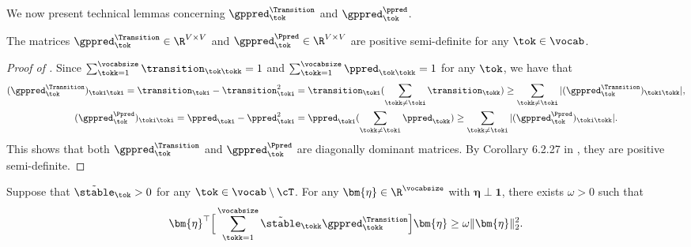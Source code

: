 We now present technical lemmas concerning $\gppred_\tok^{\Transition}$ and $\gppred_\tok^{\ppred}$.
\begin{lemma}\label{appthm:positive-definite}
The matrices $\gppred^\Transition_\tok \in \R^{V \times V}$ and $\gppred^\Ppred_\tok \in \R^{V \times V}$ are positive semi-definite for any $\tok \in \vocab$. 
\end{lemma}
\begin{proof}[Proof of ]
Since $\sum_{\tokk=1}^\vocabsize \transition_{\tok\tokk} = 1$ and $\sum_{\tokk=1}^\vocabsize \ppred_{\tok\tokk} = 1$ for any $\tok$, we have that
\begin{align*}
(\gppred^\Transition_\tok)_{\toki\toki}=\transition_\toki - \transition_{\toki}^2 & = \transition_\toki(\sum_{\tokk\neq\toki} \transition_\tokk) \geq \sum_{\tokk\neq\toki} |(\gppred^\Transition_\tok)_{\toki\tokk}|, \\
(\gppred^\Ppred_\tok)_{\toki\toki}=\ppred_\toki - \ppred_{\toki}^2 & = \ppred_\toki(\sum_{\tokk\neq\toki} \ppred_\tokk) \geq \sum_{\tokk\neq\toki} |(\gppred^\Ppred_\tok)_{\toki\tokk}|.
\end{align*}
This shows that both $\gppred^\Transition_\tok$ and $\gppred^\Ppred_\tok$ are diagonally dominant matrices. By Corollary 6.2.27 in \citet{horn2012matrix}, they are positive semi-definite.
\end{proof}
\begin{lemma}\label{appthm:min-eigenvalue}
Suppose that $\Tilde{\stable}_\tok > 0$ for any $\tok\in\vocab\setminus \cT$. For any $\bm{\eta} \in \R^\vocabsize$ with $\bm{\eta} \perp \bm{1}$, there exists $\omega>0$ such that
\[
\bm{\eta}^\top \Big[ \sum_{\tokk=1}^\vocabsize \Tilde{\stable}_\tokk \gppred_{\tokk}^{\Transition} \Big] \bm{\eta} \geq \omega \|\bm{\eta}\|_2^2.
\]
\end{lemma}
